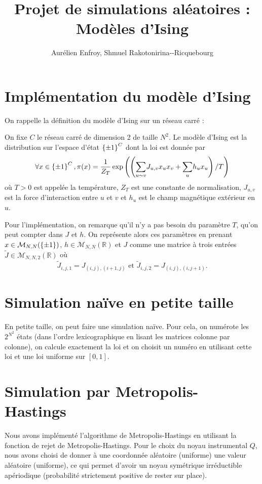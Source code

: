 \documentclass[a4paper,11pt]{article}
\title{Projet de simulations aléatoires : Modèles d'Ising}
\author{Aurélien Enfroy, Shmuel Rakotonirina{-}-Ricquebourg}
\begin{document}
\maketitle

\section{Implémentation du modèle d'Ising}

On rappelle la définition du modèle d'Ising sur un réseau carré :
\begin{definition}
On fixe $C$ le réseau carré de dimension 2 de taille $N^2$. Le modèle d'Ising est la distribution sur l'espace d'état $\left\lbrace \pm 1 \right\rbrace^C$ dont la loi est donnée par
$$\forall x \in \left\lbrace \pm 1 \right\rbrace^C, \pi(x) = \frac{1}{Z_T} \exp \left(\left( \displaystyle{\sum_{u\sim v}^{}} J_{u,v} x_{u} x_{v} + \displaystyle{\sum_{u}^{}} h_{u} x_{u} \right)/T\right)$$
où $T>0$ est appelée la température, $Z_T$ est une constante de normalisation, $J_{u,v}$ est la force d'interaction entre $u$ et $v$ et $h_{u}$ est le champ magnétique extérieur en $u$.
\end{definition}

Pour l'implémentation, on remarque qu'il n'y a pas besoin du paramètre $T$, qu'on peut compter dans $J$ et $h$. On représente alors ces paramètres en prenant $x \in \mathcal M_{N,N}(\left\lbrace \pm 1 \right\rbrace)$, $h \in \mathcal M_{N,N}(\mathbb R)$ et $J$ comme une matrice à trois entrées $\tilde J \in \mathcal M_{N,N,2}(\mathbb R)$ où
$$\tilde J_{i,j,1} = J_{(i,j),(i+1,j)} \text{ et } \tilde J_{i,j,2} = J_{(i,j),(i,j+1)}.$$

\section{Simulation naïve en petite taille}

En petite taille, on peut faire une simulation naïve. Pour cela, on numérote les $2^{N^2}$ états (dans l'ordre lexicographique en lisant les matrices colonne par colonne), on calcule exactement la loi et on choisit un numéro en utilisant cette loi et une loi uniforme sur $[0,1]$.

\section{Simulation par Metropolis-Hastings}\label{sec:MH}

Nous avons implémenté l'algorithme de Metropolis-Hastings en utilisant la fonction de rejet de Metropolis-Hastings. Pour le choix du noyau instrumental $Q$, nous avons choisi de donner à une coordonnée aléatoire (uniforme) une valeur aléatoire (uniforme), ce qui permet d'avoir un noyau symétrique irréductible apériodique (probabilité strictement positive de rester sur place).
\end{document}
